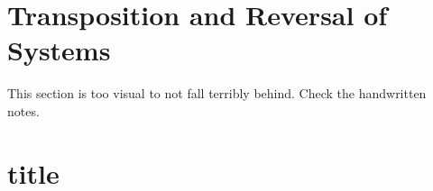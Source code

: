 \section{Transposition and Reversal of Systems}

This section is too visual to not fall terribly behind. Check the handwritten notes.

\section{title}